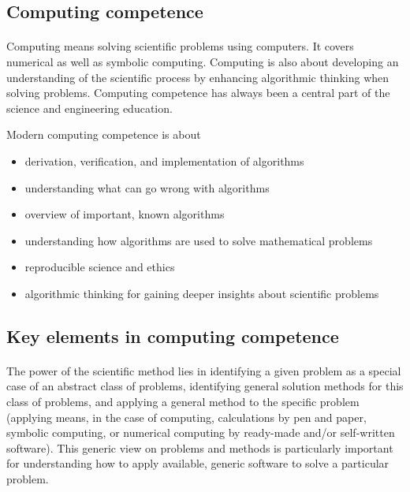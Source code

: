 \documentclass[%
oneside,                 %
final,                   %
10pt]{article}
\begin{document}
\subsection*{Computing competence}

\paragraph{}
Computing means solving scientific problems using computers. It covers
numerical as well as symbolic computing. Computing is also about
developing an understanding of the scientific process by enhancing
algorithmic thinking when solving problems.  Computing competence has
always been a central part of the science and engineering
education.

Modern computing competence is about

\begin{itemize}
\item derivation, verification, and implementation of algorithms

\item understanding what can go wrong with algorithms

\item overview of important, known algorithms

\item understanding how algorithms are used to solve mathematical problems

\item reproducible science and ethics

\item algorithmic thinking for gaining deeper insights about scientific problems
\end{itemize}

\noindent



\subsection*{Key elements in computing competence}

\paragraph{}
The power of the scientific method lies in identifying a given problem
as a special case of an abstract class of problems, identifying
general solution methods for this class of problems, and applying a
general method to the specific problem (applying means, in the case of
computing, calculations by pen and paper, symbolic computing, or
numerical computing by ready-made and/or self-written software). This
generic view on problems and methods is particularly important for
understanding how to apply available, generic software to solve a
particular problem.
\end{document}
